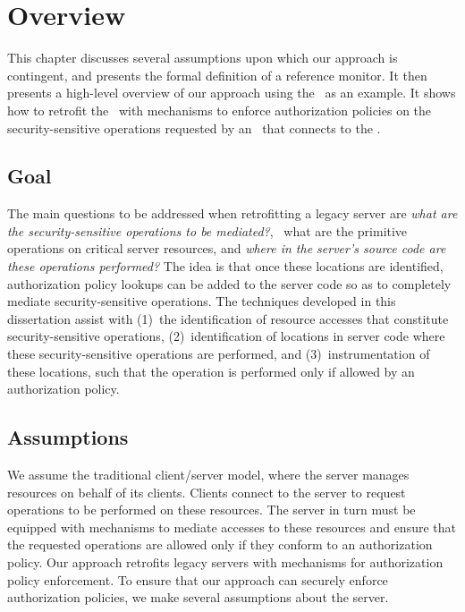 \chapter{Overview}
\label{chapter:overview}

This chapter discusses several assumptions upon which our approach is
contingent, and presents the formal definition of a reference monitor. It then
presents a high-level overview of our approach using the \xserver\ as an
example. It shows how to retrofit the \xserver\ with mechanisms to enforce
authorization policies on the security-sensitive operations requested by an
\xclient\ that connects to the \xserver. 

\section{Goal}
\label{chapter:overview:goal}

The main questions to be addressed when retrofitting a legacy server are
\textit{what are the security-sensitive operations to be mediated?}, \ie~what
are the primitive operations on critical server resources, and \textit{ where
in the server's source code are these operations performed?} The idea is that
once these locations are identified, authorization policy lookups can be added
to the server code so as to completely mediate security-sensitive operations.
The techniques developed in this dissertation assist with (1)~the
identification of resource accesses that constitute security-sensitive
operations, (2)~identification of locations in server code where these
security-sensitive operations are performed, and (3)~instrumentation of these
locations, such that the operation is performed only if allowed by an
authorization policy. 

\section{Assumptions}
\label{chapter:overview:assumptions}

We assume the traditional client/server model, where the server manages
resources on behalf of its clients. Clients connect to the server to request
operations to be performed on these resources. The server in turn must be
equipped with mechanisms to mediate accesses to these resources and ensure that
the requested operations are allowed only if they conform to an authorization
policy. Our approach retrofits legacy servers with mechanisms for authorization
policy enforcement. To ensure that our approach can securely enforce
authorization policies, we make several assumptions about the server.

